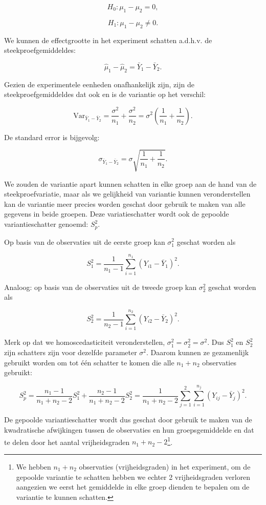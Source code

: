 \documentclass[
  12pt,dutch]{book}
\theoremstyle{definition}
\theoremstyle{definition}
\theoremstyle{definition}
\theoremstyle{definition}
\theoremstyle{remark}
\begin{document}
\[H_0: \mu_1-\mu_2 = 0,\]

\[H_1: \mu_1-\mu_2 \neq 0.\]

We kunnen de effectgrootte in het experiment schatten a.d.h.v. de steekproefgemiddeldes:

\[\hat \mu_1-\hat \mu_2=\bar Y_1 -\bar Y_2.\]

Gezien de experimentele eenheden onafhankelijk zijn, zijn de steekproefgemiddeldes dat ook en is de variantie op het verschil:

\[\text{Var}_{\bar Y_1 -\bar Y_2}=\frac{\sigma^2}{n_1}+\frac{\sigma^2}{n_2}=\sigma^2 \left(\frac{1}{n_1}+\frac{1}{n_2}\right).\]

De standard error is bijgevolg:

\[\sigma_{\bar Y_1 -\bar Y_2}=\sigma\sqrt{\frac{1}{n_1}+\frac{1}{n_2}}.\]

We zouden de variantie apart kunnen schatten in elke groep aan de hand van de steekproefvariatie, maar als we gelijkheid van variantie kunnen veronderstellen kan de variantie meer precies worden geschat door gebruik te maken van alle gegevens in beide groepen.
Deze variatieschatter wordt ook de gepoolde variantieschatter genoemd: \(S^2_p\).

Op basis van de observaties uit de eerste groep kan \(\sigma^2_1\) geschat worden als

\[S_1^2 = \frac{1}{n_1-1}\sum_{i=1}^{n_1} (Y_{i1}-\bar{Y}_1)^2.\]

Analoog: op basis van de observaties uit de tweede groep kan \(\sigma^2_2\) geschat worden als

\[S_2^2 = \frac{1}{n_2-1}\sum_{i=1}^{n_2} (Y_{i2}-\bar{Y}_2)^2.\]

Merk op dat we homoscedasticiteit veronderstellen, \(\sigma_1^2=\sigma_2^2=\sigma^2\). Dus \(S_1^2\) en \(S_2^2\) zijn schatters zijn voor dezelfde parameter \(\sigma^2\). Daarom kunnen ze gezamenlijk gebruikt worden om tot één schatter te komen die alle \(n_1+n_2\) observaties gebruikt:

\[  S_p^2 = \frac{n_1-1}{n_1+n_2-2} S_1^2 + \frac{n_2-1}{n_1+n_2-2} S_2^2 = \frac{1}{n_1+n_2-2}\sum_{j=1}^2\sum_{i=1}^{n_j} (Y_{ij} - \bar{Y}_j)^2.\]

De gepoolde variantieschatter wordt dus geschat door gebruik te maken van de kwadratische afwijkingen tussen de observaties en hun groepsgemiddelde en dat te delen door het aantal vrijheidsgraden \(n_1+n_2-2\)\footnote{We hebben \(n_1+n_2\) observaties (vrijheidsgraden) in het experiment, om de gepoolde variantie te schatten hebben we echter 2 vrijheidsgraden verloren aangezien we eerst het gemiddelde in elke groep dienden te bepalen om de variantie te kunnen schatten.}.
\end{document}
